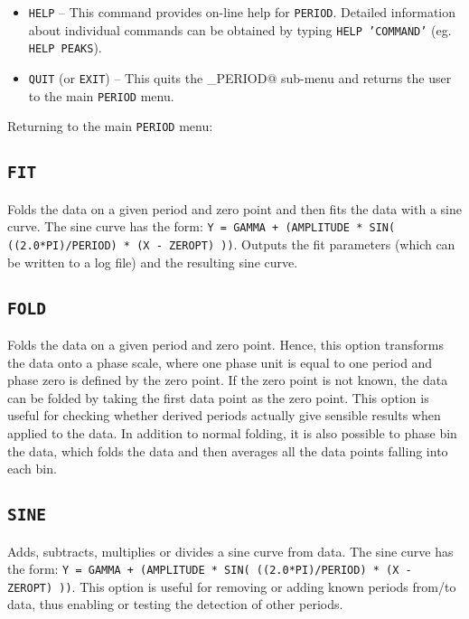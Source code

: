 \documentclass[twoside,11pt,noabs,nolof]{starlink}
\begin{document}
\begin{itemize}
\item \texttt{HELP} -- This command provides on-line help for \texttt{PERIOD}.
Detailed information about individual commands can be obtained by typing
\texttt{HELP 'COMMAND'} (eg. \texttt{HELP PEAKS}).

\item \texttt{QUIT} (or \texttt{EXIT}) -- This quits the \verb@PERIOD_PERIOD@
sub-menu and returns the user to the main \texttt{PERIOD} menu.

\end{itemize}

\clearpage
Returning to the main \texttt{PERIOD} menu:

\subsection*{\texttt{FIT}}

Folds the data on a given period and zero point and then fits the data with a
sine curve. The sine curve has the form: \texttt{Y = GAMMA + (AMPLITUDE * SIN(
((2.0*PI)/PERIOD) * (X - ZEROPT) ))}. Outputs the fit parameters (which can be
written to a log file) and the resulting sine curve.

\subsection*{\texttt{FOLD}}

Folds the data on a given period and zero point. Hence, this option transforms
the data onto a phase scale, where one phase unit is equal to one period and
phase zero is defined by the zero point. If the zero point is not known, the
data can be folded by taking the first data point as the zero point. This
option is useful for checking whether derived periods actually give sensible
results when applied to the data. In addition to normal folding, it is also
possible to phase bin the data, which folds the data and then averages all the
data points falling into each bin.

\subsection*{\texttt{SINE}}

Adds, subtracts, multiplies or divides a sine curve from data. The sine curve
has the form: \texttt{Y = GAMMA + (AMPLITUDE * SIN( ((2.0*PI)/PERIOD) * (X -
ZEROPT) ))}. This option is useful for removing or adding known periods from/to
data, thus enabling or testing the detection of other periods.
\end{document}
